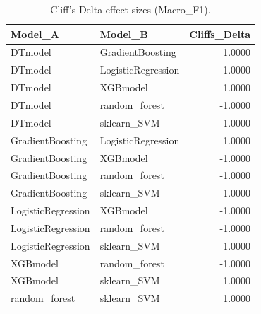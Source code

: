 \begin{table}[t]
\centering
\begin{tabular}{llr}
\toprule
Model_A & Model_B & Cliffs_Delta \\
\midrule
DTmodel & GradientBoosting & 1.0000 \\
DTmodel & LogisticRegression & 1.0000 \\
DTmodel & XGBmodel & 1.0000 \\
DTmodel & random_forest & -1.0000 \\
DTmodel & sklearn_SVM & 1.0000 \\
GradientBoosting & LogisticRegression & 1.0000 \\
GradientBoosting & XGBmodel & -1.0000 \\
GradientBoosting & random_forest & -1.0000 \\
GradientBoosting & sklearn_SVM & 1.0000 \\
LogisticRegression & XGBmodel & -1.0000 \\
LogisticRegression & random_forest & -1.0000 \\
LogisticRegression & sklearn_SVM & 1.0000 \\
XGBmodel & random_forest & -1.0000 \\
XGBmodel & sklearn_SVM & 1.0000 \\
random_forest & sklearn_SVM & 1.0000 \\
\bottomrule
\end{tabular}
\caption{Cliff's Delta effect sizes (Macro_F1).}
\label{tab:cliffs_Macro_F1}
\end{table}